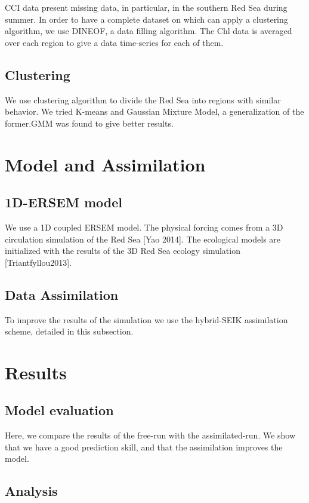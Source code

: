 \documentclass[12pt]{elsarticle}
\begin{document}
CCI data present missing data, in particular, in the southern Red Sea
during summer. In order to have a complete dataset on which can apply a 
clustering algorithm, we use DINEOF, a data filling algorithm. The Chl
data is averaged over each region to give a data time-series for each of
them.

\subsection{Clustering}

We use clustering algorithm to divide the Red Sea into regions with
similar behavior. We tried K-means and Gaussian Mixture Model, a generalization
of the former.GMM was found to give better results.

\section{Model and Assimilation}

\subsection{1D-ERSEM model}

We use a 1D coupled ERSEM model. The physical forcing comes from
a 3D circulation simulation of the Red Sea [Yao 2014]. The ecological
models are initialized with the results of the 3D Red Sea ecology 
simulation [Triantfyllou2013].

\subsection{Data Assimilation}

To improve the results of the simulation we use the hybrid-SEIK
assimilation scheme, detailed in this subsection.

\section{Results}

\subsection{Model evaluation}

Here, we compare the results of the free-run with the assimilated-run.
We show that we have a good prediction skill, and that the assimilation
improves the model.

\subsection{Analysis}
\end{document}
